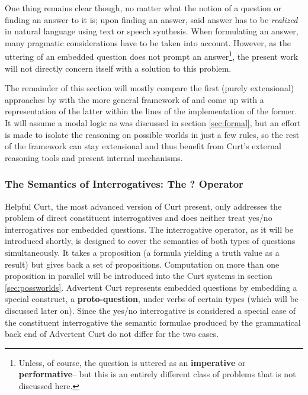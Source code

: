 \documentclass[a4paper]{article}
\newcommand{\term}[1]{\textsf{\textbf{#1}}} %
\newcommand{\pn}{\textsf} %
\newcommand{\curt}{\pn{Curt}}
\newcommand{\acurt}{\pn{Advertent Curt}}
\theoremstyle{remark}
\theoremstyle{remark}
\theoremstyle{definition}
\theoremstyle{definition}
\begin{document}
One thing remains clear though, no matter what the notion of a question or
finding an answer to it is; upon
finding an answer, said answer has to be \emph{realized} in natural language
using text or speech synthesis. When formulating an answer, many pragmatic
considerations have to be taken into account.
However, as the uttering of an embedded question does not prompt an
answer\footnote{Unless, of course, the question is uttered as an
\term{imperative} or \term{performative}-- but this is an entirely different
class of problems that is not discussed here.}, the present
work will not directly concern itself with a solution to this problem.

The remainder of this section will mostly compare the first (purely extensional)
approaches by \cite{blackburnbos:cl1} with the more general framework of
\cite{gs:q} and come up with a representation of the latter within the lines of
the implementation of the former. It will assume a modal logic as was discussed
in section \ref{sec:formal}, but an effort is made to isolate the reasoning on
possible worlds in just a few rules, so the rest of the framework can stay
extensional and thus benefit from \curt's external reasoning tools and present
internal mechanisms.

\subsubsection{The Semantics of Interrogatives: The ? Operator}\label{sec:protoq}

\pn{Helpful Curt}, the most advanced version of \curt{} \cite{blackburnbos:cl1}
present, only addresses the problem of direct constituent interrogatives and
does neither treat yes/no interrogatives nor embedded questions. The
interrogative operator, as it will be introduced shortly, is designed to cover
the semantics of both types of questions simultaneously. It takes a proposition
(a formula yielding a truth value as a result) but gives back a set of
propositions. Computation on more than one proposition in parallel will be
introduced into the \curt{} systems in section \ref{sec:possworlds}.  \acurt{}
represents embedded questions by embedding a special construct, a
\term{proto-question}, under verbs of certain types (which will be discussed
later on). Since the yes/no interrogative is considered a special case of the
constituent interrogative the semantic formulae produced by the grammatical
back end of \acurt{} do not differ for the two cases.
\end{document}
